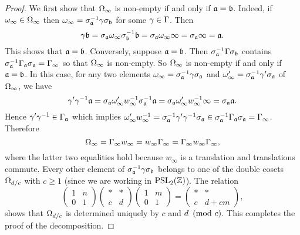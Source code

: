       \begin{proof}
        We first show that $\Omega_{\infty}$ is non-empty if and only if $\mathfrak{a} = \mathfrak{b}$. Indeed, if $\omega_{\infty} \in \Omega_{\infty}$ then $\omega_{\infty} = \sigma_{\mathfrak{a}}^{-1}\gamma\sigma_{\mathfrak{b}}$ for some $\gamma \in \Gamma$. Then
        \[
          \gamma\mathfrak{b} = \sigma_{\mathfrak{a}}\omega_{\infty}\sigma_{\mathfrak{b}}^{-1}\mathfrak{b} = \sigma_{\mathfrak{a}}\omega_{\infty}\infty = \sigma_{\mathfrak{a}}\infty = \mathfrak{a}.
        \]
        This shows that $\mathfrak{a} = \mathfrak{b}$. Conversely, suppose $\mathfrak{a} = \mathfrak{b}$. Then $\sigma_{\mathfrak{a}}^{-1}\Gamma\sigma_{\mathfrak{b}}$ contains $\sigma_{\mathfrak{a}}^{-1}\Gamma_{\mathfrak{a}}\sigma_{\mathfrak{a}} = \Gamma_{\infty}$ so that $\Omega_{\infty}$ is non-empty. So $\Omega_{\infty}$ is non-empty if and only if $\mathfrak{a} = \mathfrak{b}$. In this case, for any two elements $\omega_{\infty} = \sigma_{\mathfrak{a}}^{-1}\gamma\sigma_{\mathfrak{a}}$ and $\omega'_{\infty} = \sigma_{\mathfrak{a}}^{-1}\gamma'\sigma_{\mathfrak{a}}$ of $\Omega_{\infty}$, we have
        \[
          \gamma'\gamma^{-1}\mathfrak{a} = \sigma_{\mathfrak{a}}\omega'_{\infty}w_{\infty}^{-1}\sigma_{\mathfrak{a}}^{-1}\mathfrak{a} = \sigma_{\mathfrak{a}}\omega'_{\infty}w_{\infty}^{-1}\infty = \sigma_{\mathfrak{a}}\mathfrak{a}.
        \]
        Hence $\gamma'\gamma^{-1} \in \Gamma_{\mathfrak{a}}$ which implies $\omega'_{\infty}w_{\infty}^{-1} = \sigma_{\mathfrak{a}}^{-1}\gamma'\gamma^{-1}\sigma_{\mathfrak{a}} \in \sigma_{\mathfrak{a}}^{-1}\Gamma_{\mathfrak{a}}\sigma_{\mathfrak{a}} = \Gamma_{\infty}$. Therefore
        \[
          \Omega_{\infty} = \Gamma_{\infty}w_{\infty} = w_{\infty}\Gamma_{\infty} = \Gamma_{\infty}w_{\infty}\Gamma_{\infty},
        \]
        where the latter two equalities hold because $w_{\infty}$ is a translation and translations commute. Every other element of $\sigma_{\mathfrak{a}}^{-1}\gamma\sigma_{\mathfrak{b}}$ belongs to one of the double cosets $\Omega_{d/c}$ with $c \ge 1$ (since we are working in $\mathrm{PSL}_{2}(\mathbb{Z})$). The relation
        \[
          \begin{pmatrix} 1 & n \\ 0 & 1 \end{pmatrix}\begin{pmatrix} \ast & \ast \\ c & d \end{pmatrix}\begin{pmatrix} 1 & m \\ 0 & 1 \end{pmatrix} = \begin{pmatrix} \ast & \ast \\ c & d+cm \end{pmatrix},
        \]
        shows that $\Omega_{d/c}$ is determined uniquely by $c$ and $d \ \left(\text{mod }c\right)$. This completes the proof of the decomposition.
      \end{proof}

